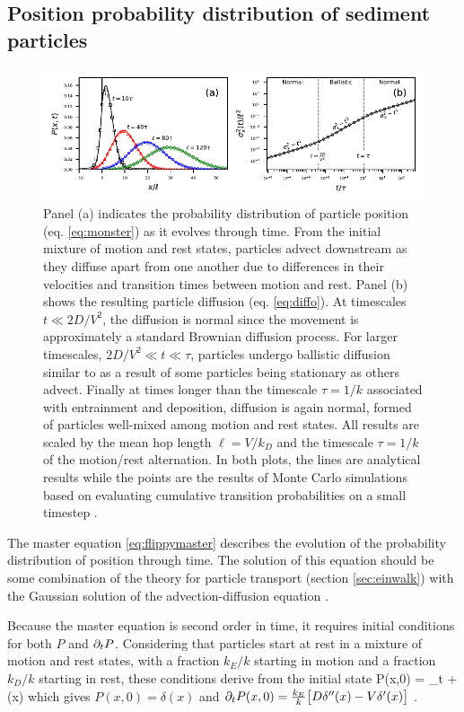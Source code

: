 \subsection{Position probability distribution of sediment particles}
\begin{figure}
	\centerline{\includegraphics{figures/ch2/figure2_slopeKey.pdf}}
	\caption{Panel (a) indicates the probability distribution of particle position (eq. \ref{eq:monster}) as it evolves through time. From the initial mixture of motion and rest states, particles advect downstream as they diffuse apart from one another due to differences in their velocities and transition times between motion and rest. Panel (b) shows the resulting particle diffusion (eq. \ref{eq:diffo}). At timescales $t \ll 2D/V^2$, the diffusion is normal since the movement is approximately a standard Brownian diffusion process. For larger timescales, $2D/V^2 \ll t \ll \tau$, particles undergo ballistic diffusion similar to \citet{Lisle1998} as a result of some particles being stationary as others advect. Finally at times longer than the timescale $\tau = 1/k$ associated with entrainment and deposition, diffusion is again normal, formed of particles well-mixed among motion and rest states. All results are scaled by the mean hop length $\ell=V/k_D$ and the timescale $\tau=1/k$ of the motion/rest alternation. In both plots, the lines are analytical results while the points are the results of Monte Carlo simulations based on evaluating cumulative transition probabilities on a small timestep \citep[e.g.][]{Barik2006}.}
	\label{fig:flippyfig1}
\end{figure}
The master equation \ref{eq:flippymaster} describes the evolution of the probability distribution of position through time. The solution of this equation should be some combination of the \citet{Einstein1937} theory for particle transport (section \ref{sec:einwalk}) with the Gaussian solution of the advection-diffusion equation \citep{Morse1953a}.

Because the master equation is second order in time, it requires initial conditions for both $P$ and $\partial_t P$. Considering that particles start at rest in a mixture of motion and rest states, with a fraction $k_E/k$ starting in motion and a fraction $k_D/k$ starting in rest, these conditions derive from the initial state 
\be P(x,0) = \lim_{t }   \exp{}+ \delta(x)\ee
which gives $P(x,0) = \delta(x)$ and $ \partial_t P(x,0) = \frac{k_E}{k}\big[D\delta''(x)-V \delta'(x) \big]$ \citep[c.f.][]{Weiss2002a}.

